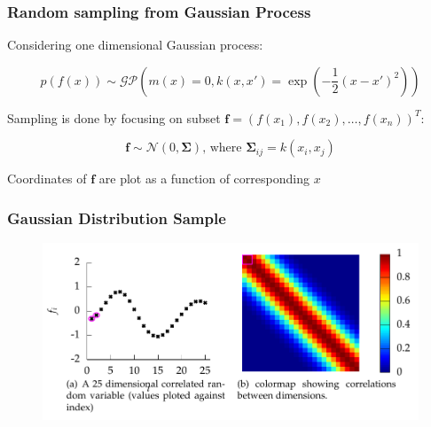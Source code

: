 \documentclass[10pt]{beamer}
\newcommand{\boldf}{\mathbf{f}}
\newcommand{\gp}{\mathcal{GP}}
\newcommand{\gaussN}{\mathcal{N}}
\newcommand{\bSig}{\boldsymbol{\Sigma}}
\begin{document}
  \begin{frame}
    \frametitle{Random sampling from Gaussian Process}
    Considering one dimensional Gaussian process:

    \begin{equation*}
      p(f(x)) \sim \gp \left( m(x) = 0, k(x,x') = \exp \left( - \frac{1}{2} (x - x')^2 \right) \right)
    \end{equation*}

    Sampling is done by focusing on subset $\boldf = (f(x_1), f(x_2),\dots,f(x_n))^T$:

    \begin{equation*}
      \boldf \sim \gaussN(0,\bSig) \text{, where } \bSig_{ij} = k(x_i,x_j)
    \end{equation*}

    Coordinates of $\boldf$ are plot as a function of corresponding $x$
  \end{frame}

  \begin{frame}
    \frametitle{Gaussian Distribution Sample}

    \begin{figure}
      \centering
      \includegraphics[width=\textwidth]{samplePath.png}
    \end{figure}
  \end{frame}
\end{document}
